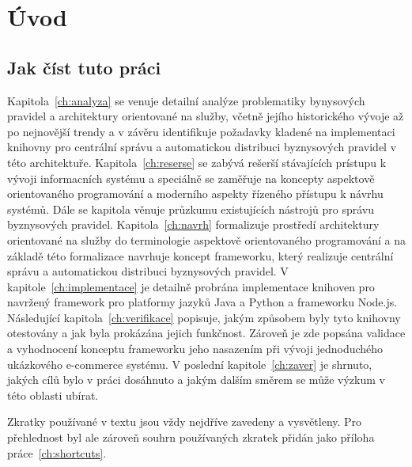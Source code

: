 

\chapter{Úvod}\label{ch:uvod}


\section{Jak číst tuto práci}

Kapitola~\ref{ch:analyza} se venuje detailní analýze problematiky bynysových pravidel a
architektury orientované na služby, včetně jejího historického vývoje až po nejnovější trendy
a v závěru identifikuje požadavky kladené na implementaci knihovny pro centrální správu a
automatickou distribuci byznysových pravidel v této architektuře. Kapitola~\ref{ch:reserse}
se zabývá rešerší stávajících prístupu k vývoji informacních systému a speciálně se zaměřuje
na koncepty aspektově orientovaného programování a moderního aspekty řízeného přístupu k návrhu
systémů. Dále se kapitola věnuje průzkumu existujících nástrojů pro správu byznysových pravidel.
Kapitola~\ref{ch:navrh} formalizuje prostředí architektury orientované na služby do terminologie
aspektově orientovaného programování a na základě této formalizace navrhuje koncept frameworku,
který realizuje centrální správu a automatickou distribuci byznysových pravidel.
V kapitole~\ref{ch:implementace} je detailně probrána implementace knihoven pro navržený framework
pro platformy jazyků Java a Python a frameworku Node.js. Následující kapitola~\ref{ch:verifikace}
popisuje, jakým způsobem byly tyto knihovny otestovány a jak byla prokázána jejich funkčnost. Zároveň
je zde popsána validace a vyhodnocení konceptu frameworku jeho nasazením při vývoji
jednoduchého ukázkového e-commerce systému. V poslední kapitole~\ref{ch:zaver} je shrnuto, jakých
cílů bylo v práci dosáhnuto a jakým dalším směrem se může výzkum v této oblasti ubírat.

Zkratky používané v textu jsou vždy nejdříve zavedeny a vysvětleny. Pro přehlednost byl ale zároveň
souhrn používaných zkratek přidán jako příloha práce~\ref{ch:shortcuts}.
